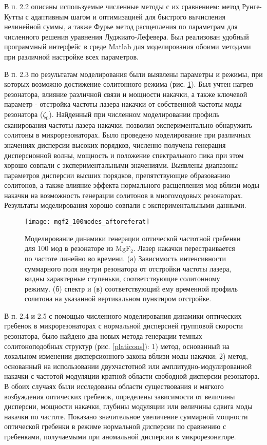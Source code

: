 В п. 2.2 описаны используемые численные методы с их сравнением: метод Рунге-Кутты с адаптивным шагом и оптимизацией для быстрого вычисления нелинейной суммы, а также Фурье метод расщепления по параметрам для численного решения уравнения Луджиато-Лефевера. Был реализован удобный программный интерфейс в среде Matlab для моделирования обоими методами при различной настройке всех параметров.

В п. 2.3 по результатам моделирования были выявлены параметры и режимы, при которых возможно достижение солитонного режима (рис. \ref{100modes}). Был учтен нагрев резонатора, влияние различной связи и мощности накачки, а также ключевой параметр - отстройка частоты лазера накачки от собственной частоты моды резонатора ($\zeta_0$). Найденный при численном моделировании профиль сканирования частоты лазера накачки, позволил экспериментально обнаружить солитоны в микрорезонаторах. Было проведено моделирование при различных значениях дисперсии высоких порядков, численно получена генерация дисперсионной волны, мощность и положение спектрального пика при этом хорошо совпали с экспериментальными значениями. Выявлены диапазоны параметров дисперсии высших порядков, препятствующие образованию солитонов, а также влияние эффекта нормального расщепления мод вблизи моды накачки на возможность генерации солитонов в многомодовых резонаторах. Результаты моделирования хорошо совпали с экспериментальными данными.

\begin{figure}[!htb]
  \centering
  \texttt{[image: mgf2\_100modes\_aftoreferat]}
  \caption{Моделирование динамики генерации оптической частотной гребенки для 100 мод в резонаторе из MgF$_2$. Лазер накачки перестраивается по частоте линейно во времени. (а) Зависимость интенсивности суммарного поля внутри резонатора от отстройки частоты лазера, видны характерные ступеньки, соответствующие солитонному режиму. (б) спектр и (в) соответствующий ему временной профиль солитона на указанной вертикальном пунктиром отстройке.}
  \label{100modes}
\end{figure}

В п. 2.4 и 2.5 с помощью численного моделирования динамики оптических гребенок в микрорезонаторах с нормальной дисперсией групповой скорости резонатора, было найдено два новых метода генерации темных солитоноподобных структур (рис. \ref{platicons}): 1) метод, основанный на локальном изменении дисперсионного закона вблизи моды накачки; 2) метод, основанный на использовании двухчастотной или амплитудно-модулированной накачки с частотой модуляции кратной области свободной дисперсии резонатора. В обоих случаях были исследованы области существования и мягкого возбуждения оптических гребенок, определены зависимости от величины дисперсии, мощности накачки, глубины модуляции или величины сдвига моды накачки по частоте. Показано значительное увеличение суммарной мощности оптической гребенки в режиме нормальной дисперсии по сравнению с гребенками, получаемыми при аномальной дисперсии в микрорезонаторе.

